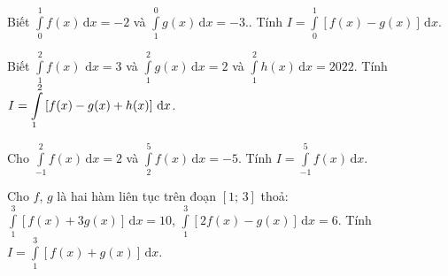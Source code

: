 \begin{ex}%
Biết $\displaystyle\int\limits_0^1f(x)\mathrm{\,d}x=-2$ và $\displaystyle\int\limits_1^0g(x)\mathrm{\,d}x=-3$.. Tính $ I=\displaystyle\int\limits_0^1\left[f(x)-g(x)\right]\mathrm{\,d}x$.\\
\end{ex}

\begin{ex}%
Biết $\displaystyle\int\limits_1^2f(x)\,\mathrm{\,d}x=3$ và $\displaystyle\int\limits_1^2g(x)\mathrm{\,d}x=2$ và $\displaystyle\int\limits_1^2h(x)\mathrm{\,d}x=2022$. Tính $\linebreak I=\displaystyle\int\limits_1^2\left[f(x)-g(x)+h(x)\right]\mathrm{\,d}x$.\\
\end{ex}

\begin{ex}%
Cho $\displaystyle\int\limits_{-1}^2f(x)\mathrm{\,d}x=2$ và $\displaystyle\int\limits_2^5f(x)\mathrm{\,d}x=-5$. Tính $ I=\displaystyle\int\limits_{-1}^5f(x)\mathrm{\,d}x$.\\
\end{ex}

\begin{ex}%
Cho $ f$, $ g$ là hai hàm liên tục trên đoạn $\left[1;\,3\right]$ thoả$\colon $ $\displaystyle\int\limits_1^3\left[f(x)+3g(x)\right]\mathrm{\,d}x=10$, $\displaystyle\int\limits_1^3\left[2f(x)-g(x)\right]\mathrm{\,d}x=6$. Tính $I=\displaystyle\int\limits_1^3\left[f(x)+g(x)\right]\mathrm{\,d}x$.\\
\end{ex}

